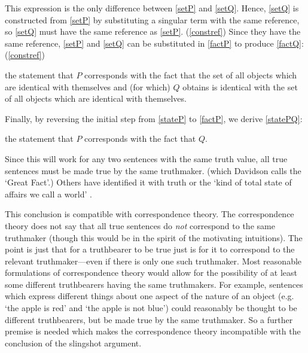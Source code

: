 This expression is the only difference between \ref{setP} and \ref{setQ}.
Hence, \ref{setQ} is constructed from \ref{setP} by substituting a singular term with the same reference, so \ref{setQ} must have the same reference as \ref{setP}.
(\ref{constref})
Since they have the same reference, \ref{setP} and \ref{setQ} can be substituted in \ref{factP} to produce \ref{factQ}:
(\ref{constref}) 

	\begin{example}\label{factQ}
	the statement that $P$ corresponds with the fact that the set of all objects which are identical with themselves and (for which) $Q$ obtains is identical with the set of all objects which are identical with themselves.
	\end{example}

Finally, by reversing the initial step from \ref{stateP} to \ref{factP}, we derive \ref{statePQ}:

	\begin{example}\label{statePQ}
	the statement that $P$ corresponds with the fact that $Q$.
	\end{example}

Since this will work for any two sentences with the same truth value, all true sentences must be made true by the same truthmaker. (which Davidson calls the `Great Fact'.)
\parencite[753]{Davidson_1969}
Others have identified it with truth \parencite[216]{Frege_1948} or the `kind of total state of affairs we call a world' \parencite[242]{Lewis1943-LEWTMO}.

This conclusion is compatible with correspondence theory.
The correspondence theory does not say that all true sentences do \emph{not} correspond to the same truthmaker (though this would be in the spirit of the motivating intuitions).
The point is just that for a truthbearer to be true just is for it to correspond to the relevant truthmaker---even if there is only one such truthmaker.
Most reasonable formulations of correspondence theory would allow for the possibility of at least some different truthbearers having the same truthmakers.
For example, sentences which express different things about one aspect of the nature of an object (e.g. `the apple is red' and `the apple is not blue')	could reasonably be thought to be different truthbearers, but be made true by the same truthmaker.
So a further premise is needed which makes the correspondence theory incompatible with the conclusion of the slingshot argument.

